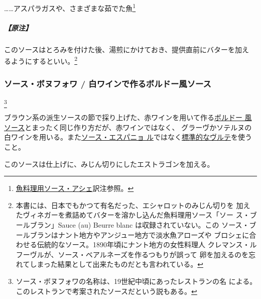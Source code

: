 \begin{recette}
\ldots{}\ldots{}アスパラガスや、さまざまな茹でた魚\footnote{\protect\hyperlink{sauce-hachee-maigre}{魚料理用ソース・アシェ}訳注参照。}

\hypertarget{nota-sauce-au-beurre}{%
\subparagraph{【原注】}\label{nota-sauce-au-beurre}}

このソースはとろみを付けた後、湯煎にかけておき、提供直前にバターを加え
るようにするといい。\footnote{本書には、日本でもかつて有名だった、エシャロットのみじん切りを
  加えたヴィネガーを煮詰めてバターを溶かし込んだ魚料理用ソース「ソー
  ス・ブールブラン」Sauce (au) Beurre blanc は収録されていない。この
  ソース・ブールブランはナント地方やアンジュー地方で淡水魚アローズや
  ブロシェに合わせる伝統的なソース。1890年頃にナント地方の女性料理人
  クレマンス・ルフーヴルが、ソース・ベアルネーズを作るつもりが誤って
  卵を加えるのを忘れてしまった結果として出来たものだとも言われている。}

\maeaki

\hypertarget{sauce-bonnefoy}{%
\subsubsection{ソース・ボヌフォワ /
白ワインで作るボルドー風ソース}\label{sauce-bonnefoy}}

\footnote{ソース・ボヌフォワの名称は、19世紀中頃にあったレストランの名
  による。このレストランで考案されたソースだという説もある。}


ブラウン系の派生ソースの節で採り上げた、赤ワインを用いて作る\protect\hyperlink{sauce-bordelaise}{ボルドー
風ソース}とまったく同じ作り方だが、赤ワインではなく、
グラーヴかソテルヌの白ワインを用いる。また\protect\hyperlink{sauce-espagnole}{ソース・エスパニョ
ル}ではなく\protect\hyperlink{veloute}{標準的なヴルテ}を使うこと。

このソースは仕上げに、みじん切りにしたエストラゴンを加える。


\end{recette}
